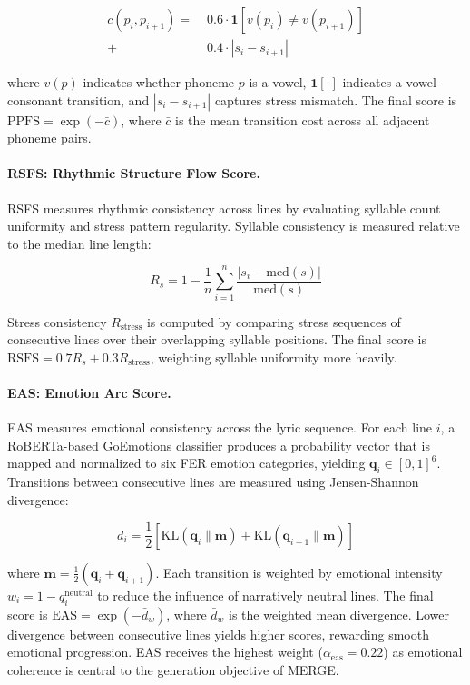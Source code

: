 \documentclass[11pt]{article}
\begin{document}
\begin{equation}
\begin{split}
c(p_i, p_{i+1}) = \; & 0.6 \cdot \mathbf{1}[v(p_i) \neq v(p_{i+1})] \\
                    + \; & 0.4 \cdot |s_i - s_{i+1}|
\end{split}
\end{equation}

where $v(p)$ indicates whether phoneme $p$ is a vowel, $\mathbf{1}[\cdot]$ indicates a vowel-consonant transition, and 
$|s_i - s_{i+1}|$ captures stress mismatch. The final score is 
$\text{PPFS} = \exp(-\bar{c})$, where $\bar{c}$ is the mean transition cost 
across all adjacent phoneme pairs.

\paragraph{RSFS: Rhythmic Structure Flow Score.}
RSFS measures rhythmic consistency across lines by evaluating syllable count 
uniformity and stress pattern regularity. Syllable consistency is measured 
relative to the median line length:

\begin{equation}
R_s = 1 - \frac{1}{n} \sum_{i=1}^{n} \frac{|s_i - \text{med}(s)|}{\text{med}(s)}
\end{equation}

Stress consistency $R_{\text{stress}}$ is computed by comparing stress 
sequences of consecutive lines over their overlapping syllable positions. 
The final score is $\text{RSFS} = 0.7 R_s + 0.3 R_{\text{stress}}$, 
weighting syllable uniformity more heavily.

\paragraph{EAS: Emotion Arc Score.}
EAS measures emotional consistency across the lyric sequence. For each line 
$i$, a RoBERTa-based GoEmotions classifier produces a probability vector that 
is mapped and normalized to six FER emotion categories, yielding 
$\mathbf{q}_i \in [0,1]^6$. Transitions between consecutive lines are measured 
using Jensen-Shannon divergence:

\begin{equation}
d_i = \frac{1}{2}\left[\text{KL}(\mathbf{q}_i \| \mathbf{m}) + 
\text{KL}(\mathbf{q}_{i+1} \| \mathbf{m})\right]
\end{equation}

where $\mathbf{m} = \frac{1}{2}(\mathbf{q}_i + \mathbf{q}_{i+1})$. Each 
transition is weighted by emotional intensity $w_i = 1 - q_i^{\text{neutral}}$ 
to reduce the influence of narratively neutral lines. The final score is 
$\text{EAS} = \exp(-\bar{d}_w)$, where $\bar{d}_w$ is the weighted mean 
divergence. Lower divergence between consecutive lines yields higher scores, 
rewarding smooth emotional progression. EAS receives the highest weight 
($\alpha_{\text{eas}} = 0.22$) as emotional coherence is central to the 
generation objective of MERGE.
\end{document}
